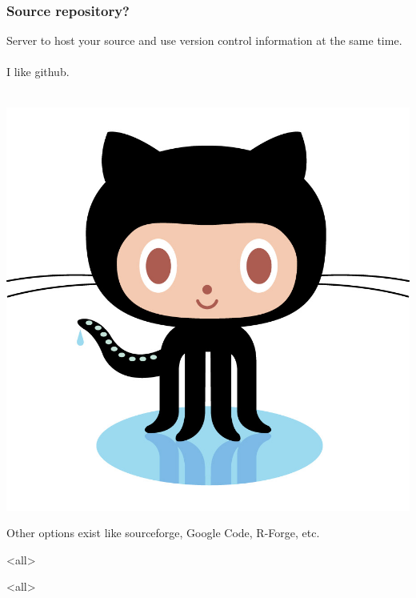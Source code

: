\documentclass{beamer}\usepackage{graphicx, color}
\begin{document}
\begin{frame}
\frametitle{Source repository?}
Server to host your source and use version control information at the same time.
\\~\\
I like github.
\\~\\
\begin{center}
\includegraphics[height = 0.4\textheight]{original}
\end{center}

Other options exist like sourceforge, Google Code, R-Forge, etc.
\end{frame}


\mode<all>
{
\begin{frame}[plain]
\end{frame}
}
\mode<all>{\usebackgroundtemplate{}}
\mode*
\end{document}

